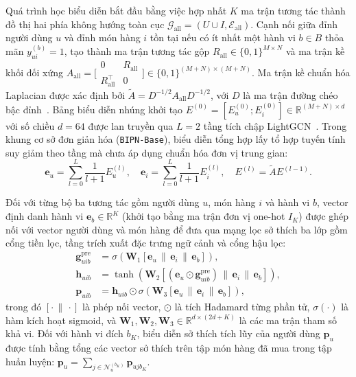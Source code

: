 \documentclass{llncs}
\begin{document}
Quá trình học biểu diễn bắt đầu bằng việc hợp nhất $K$ ma trận tương tác thành đồ thị hai phía không hướng toàn cục $\mathcal{G}_{\mathrm{all}} = (U \cup I, \mathcal{E}_{\mathrm{all}})$. Cạnh nối giữa đỉnh người dùng $u$ và đỉnh món hàng $i$ tồn tại nếu có ít nhất một hành vi $b \in B$ thỏa mãn $y_{ui}^{(b)} = 1$, tạo thành ma trận tương tác gộp $R_{\mathrm{all}} \in \{0, 1\}^{M \times N}$ và ma trận kề khối đối xứng $A_{\mathrm{all}} = \bigl[\begin{smallmatrix} 0 & R_{\mathrm{all}} \\ R_{\mathrm{all}}^\top & 0 \end{smallmatrix}\bigr] \in \{0, 1\}^{(M+N) \times (M+N)}$. Ma trận kề chuẩn hóa Laplacian được xác định bởi $\tilde{A} = D^{-1/2} A_{\mathrm{all}} D^{-1/2}$, với $D$ là ma trận đường chéo bậc đỉnh~\cite{kipf2017semi}. Bảng biểu diễn nhúng khởi tạo $E^{(0)} = [E_u^{(0)}; E_i^{(0)}] \in \mathbb{R}^{(M+N) \times d}$ với số chiều $d=64$ được lan truyền qua $L=2$ tầng tích chập LightGCN~\cite{he2020lightgcn}. Trong khung cơ sở đơn giản hóa (\texttt{BIPN-Base}), biểu diễn tổng hợp lấy tổ hợp tuyến tính suy giảm theo tầng mà chưa áp dụng chuẩn hóa đơn vị trung gian:
\begin{equation}
\mathbf{e}_u = \sum_{l=0}^L \frac{1}{l+1} E_u^{(l)}, \quad \mathbf{e}_i = \sum_{l=0}^L \frac{1}{l+1} E_i^{(l)}, \quad E^{(l)} = \tilde{A} E^{(l-1)}.
\label{eq:gcn_base}
\end{equation}

Đối với từng bộ ba tương tác gồm người dùng $u$, món hàng $i$ và hành vi $b$, vector định danh hành vi $\mathbf{e}_b \in \mathbb{R}^K$ (khởi tạo bằng ma trận đơn vị one-hot $I_K$) được ghép nối với vector người dùng và món hàng để đưa qua mạng lọc sở thích ba lớp gồm cổng tiền lọc, tầng trích xuất đặc trưng ngữ cảnh và cổng hậu lọc:
\begin{align}
\mathbf{g}_{uib}^{\mathrm{pre}} &= \sigma\left(\mathbf{W}_1 [\mathbf{e}_u \,\|\, \mathbf{e}_i \,\|\, \mathbf{e}_b]\right), \label{eq:gate} \\
\mathbf{h}_{uib} &= \tanh\left(\mathbf{W}_2 [(\mathbf{e}_u \odot \mathbf{g}_{uib}^{\mathrm{pre}}) \,\|\, \mathbf{e}_i \,\|\, \mathbf{e}_b]\right), \label{eq:hidden} \\
\mathbf{p}_{uib} &= \mathbf{h}_{uib} \odot \sigma\left(\mathbf{W}_3 [\mathbf{e}_u \,\|\, \mathbf{e}_i \,\|\, \mathbf{e}_b]\right), \label{eq:pref}
\end{align}
trong đó $[\cdot \,\|\, \cdot]$ là phép nối vector, $\odot$ là tích Hadamard từng phần tử, $\sigma(\cdot)$ là hàm kích hoạt sigmoid, và $\mathbf{W}_1, \mathbf{W}_2, \mathbf{W}_3 \in \mathbb{R}^{d \times (2d+K)}$ là các ma trận tham số khả vi. Đối với hành vi đích $b_K$, biểu diễn sở thích tích lũy của người dùng $\mathbf{p}_u$ được tính bằng tổng các vector sở thích trên tập món hàng đã mua trong tập huấn luyện: $\mathbf{p}_u = \sum_{j \in \mathcal{N}_u^{(b_K)}} \mathbf{p}_{uj b_K}$.
\end{document}
